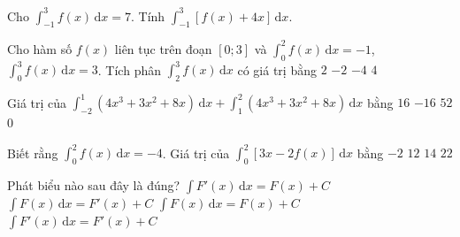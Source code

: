 \begin{bt}%
	Cho $\displaystyle \int_{-1}^{3} f(x)\mathrm{\,d}x  = 7$. Tính $\displaystyle \int_{-1}^{3} [f(x)+4x]\mathrm{\,d}x$.
\end{bt}

\begin{ex}%
	Cho hàm số $f(x)$ liên tục trên đoạn $[0;3]$ và $\displaystyle\int_0^2 f(x)\mathrm{\,d}x =-1$, $\displaystyle\int_0^3 f(x)\mathrm{\,d}x =3$. Tích phân $\displaystyle\int_2^3 f(x)\mathrm{\,d}x$  có giá trị bằng
	 \choice
		{$2$} 
		{$-2$} 
		{$-4$} 
		{\True  $4$}
\end{ex}

\begin{ex}%
	Giá trị  của $\displaystyle\int_{-2}^{1}(4x^3+3x^2+8x)\mathrm{\,d}x+\displaystyle\int_{1}^{2}(4x^3+3x^2+8x)\mathrm{\,d}x$ bằng
	 \choice
		{\True $16$} 
		 {$-16$}
		 {$52$}
		 {$0$}
\end{ex}

\begin{ex}%
	 Biết rằng $\displaystyle\int_{0}^{2}f(x)\mathrm{\,d}x=-4$. Giá trị của $\displaystyle\int_{0}^{2}[3x-2f(x)]\mathrm{\,d}x$ bằng
	\choice 
		{$-2$} 
		 {$12$}
		{\True $14$} 
		{$22$} 
\end{ex}

\begin{ex}%
	Phát biểu nào sau đây  là đúng?
	 \choice
		{\True $\displaystyle\int F'(x) \mathrm{\,d}  x=F(x)+C$}
		{$\displaystyle\int F(x) \mathrm{\,d}  x=F'(x)+C$}
		{$\displaystyle\int  F(x) \mathrm{\,d} x=F(x)+C$}
		{$\displaystyle\int F'(x)  \mathrm{\,d} x=F'(x)+C$}
\end{ex}

